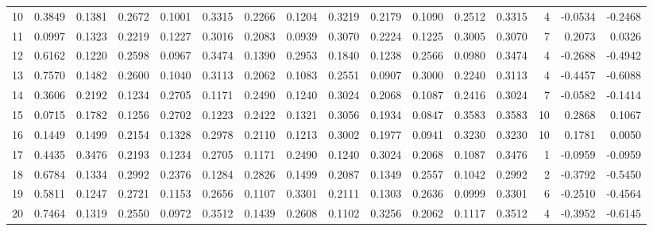 \begin{tabular}{lrrrrrrrrrrrrrrr}
10  &      0.3849 &  0.1381 &  0.2672 &  0.1001 &  0.3315 &  0.2266 &  0.1204 &  0.3219 &  0.2179 &  0.1090 &   0.2512 &     0.3315 &      4 &                   -0.0534 &                    -0.2468 \\
11  &      0.0997 &  0.1323 &  0.2219 &  0.1227 &  0.3016 &  0.2083 &  0.0939 &  0.3070 &  0.2224 &  0.1225 &   0.3005 &     0.3070 &      7 &                    0.2073 &                     0.0326 \\
12  &      0.6162 &  0.1220 &  0.2598 &  0.0967 &  0.3474 &  0.1390 &  0.2953 &  0.1840 &  0.1238 &  0.2566 &   0.0980 &     0.3474 &      4 &                   -0.2688 &                    -0.4942 \\
13  &      0.7570 &  0.1482 &  0.2600 &  0.1040 &  0.3113 &  0.2062 &  0.1083 &  0.2551 &  0.0907 &  0.3000 &   0.2240 &     0.3113 &      4 &                   -0.4457 &                    -0.6088 \\
14  &      0.3606 &  0.2192 &  0.1234 &  0.2705 &  0.1171 &  0.2490 &  0.1240 &  0.3024 &  0.2068 &  0.1087 &   0.2416 &     0.3024 &      7 &                   -0.0582 &                    -0.1414 \\
15  &      0.0715 &  0.1782 &  0.1256 &  0.2702 &  0.1223 &  0.2422 &  0.1321 &  0.3056 &  0.1934 &  0.0847 &   0.3583 &     0.3583 &     10 &                    0.2868 &                     0.1067 \\
16  &      0.1449 &  0.1499 &  0.2154 &  0.1328 &  0.2978 &  0.2110 &  0.1213 &  0.3002 &  0.1977 &  0.0941 &   0.3230 &     0.3230 &     10 &                    0.1781 &                     0.0050 \\
17  &      0.4435 &  0.3476 &  0.2193 &  0.1234 &  0.2705 &  0.1171 &  0.2490 &  0.1240 &  0.3024 &  0.2068 &   0.1087 &     0.3476 &      1 &                   -0.0959 &                    -0.0959 \\
18  &      0.6784 &  0.1334 &  0.2992 &  0.2376 &  0.1284 &  0.2826 &  0.1499 &  0.2087 &  0.1349 &  0.2557 &   0.1042 &     0.2992 &      2 &                   -0.3792 &                    -0.5450 \\
19  &      0.5811 &  0.1247 &  0.2721 &  0.1153 &  0.2656 &  0.1107 &  0.3301 &  0.2111 &  0.1303 &  0.2636 &   0.0999 &     0.3301 &      6 &                   -0.2510 &                    -0.4564 \\
20  &      0.7464 &  0.1319 &  0.2550 &  0.0972 &  0.3512 &  0.1439 &  0.2608 &  0.1102 &  0.3256 &  0.2062 &   0.1117 &     0.3512 &      4 &                   -0.3952 &                    -0.6145 \\

\end{tabular}
